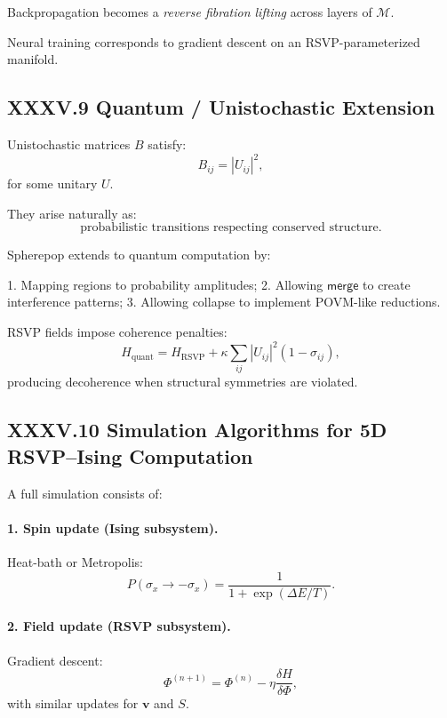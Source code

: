 \documentclass[12pt,letterpaper]{article}
\begin{document}
Backpropagation becomes 
a \emph{reverse fibration lifting} across layers of $\mathcal{M}$.

Neural training corresponds to  
gradient descent on an RSVP-parameterized manifold.

\subsection{XXXV.9 Quantum / Unistochastic Extension}

Unistochastic matrices $B$ satisfy:
\[
B_{ij} = |U_{ij}|^2,
\]
for some unitary $U$.

They arise naturally as:
\[
\text{probabilistic transitions respecting conserved structure}.
\]

Spherepop extends to quantum computation by:

1. Mapping regions to probability amplitudes;  
2. Allowing $\mathsf{merge}$ to create interference patterns;  
3. Allowing collapse to implement POVM-like reductions.

RSVP fields impose coherence penalties:
\[
H_{\text{quant}} 
= H_{\text{RSVP}}
+ \kappa \sum_{ij} |U_{ij}|^2 (1 - \sigma_{ij}),
\]
producing decoherence when structural symmetries are violated.

\subsection{XXXV.10 Simulation Algorithms for 5D RSVP–Ising Computation}

A full simulation consists of:

\paragraph{1. Spin update (Ising subsystem).}
Heat-bath or Metropolis:
\[
P(\sigma_x \to -\sigma_x) 
=
\frac{1}{1 + \exp(\Delta E / T)}.
\]

\paragraph{2. Field update (RSVP subsystem).}
Gradient descent:
\[
\Phi^{(n+1)} = \Phi^{(n)} - \eta \frac{\delta H}{\delta \Phi},
\]
with similar updates for $\mathbf{v}$ and $S$.
\end{document}
